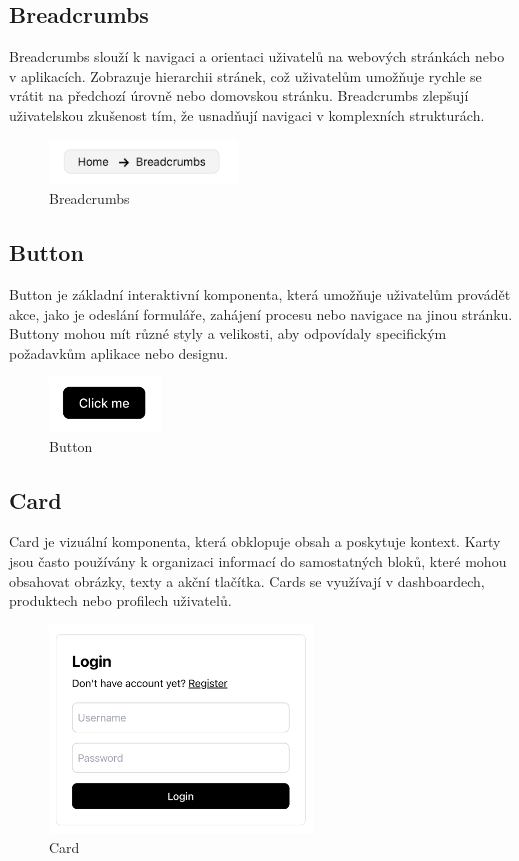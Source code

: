\subsection{Breadcrumbs}
Breadcrumbs slouží k navigaci a orientaci uživatelů na webových stránkách nebo v aplikacích. Zobrazuje hierarchii stránek, což uživatelům umožňuje rychle se vrátit na předchozí úrovně nebo domovskou stránku. Breadcrumbs zlepšují uživatelskou zkušenost tím, že usnadňují navigaci v komplexních strukturách.

\begin{figure}[H]
  \centering
  \includegraphics[width=5cm]{images/breadcrumbs}
  \captionsetup{justification=centering,margin=2cm}
  \caption{Breadcrumbs} \label{picture:breadcrumbs}
\end{figure}

\subsection{Button}
Button je základní interaktivní komponenta, která umožňuje uživatelům provádět akce, jako je odeslání formuláře, zahájení procesu nebo navigace na jinou stránku. Buttony mohou mít různé styly a velikosti, aby odpovídaly specifickým požadavkům aplikace nebo designu.

\begin{figure}[H]
  \centering
  \includegraphics[width=3cm]{images/button}
  \captionsetup{justification=centering,margin=2cm}
  \caption{Button} \label{picture:button}
\end{figure}

\subsection{Card}
Card je vizuální komponenta, která obklopuje obsah a poskytuje kontext. Karty jsou často používány k organizaci informací do samostatných bloků, které mohou obsahovat obrázky, texty a akční tlačítka. Cards se využívají v dashboardech, produktech nebo profilech uživatelů.

\begin{figure}[H]
  \centering
  \includegraphics[width=7cm]{images/card}
  \captionsetup{justification=centering,margin=2cm}
  \caption{Card} \label{picture:card}
\end{figure}

